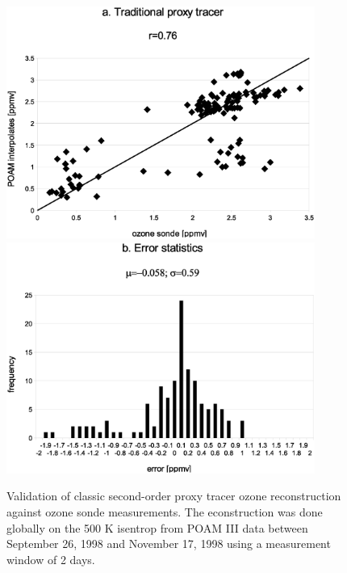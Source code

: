\documentclass{article}
\begin{document}
\begin{figure}
  \centering
  \includegraphics[width=0.9\textwidth]{global_classic_sonde_scatter}
  \includegraphics[width=0.9\textwidth]{global_classic_sonde_error}
  \caption{Validation of classic second-order proxy tracer ozone reconstruction against ozone sonde measurements. The econstruction was done globally on the 500 K isentrop from POAM III data between September 26, 1998 and November 17, 1998 using a measurement window of 2 days.}
  \label{global_classic_sonde}
\end{figure}
\end{document}
